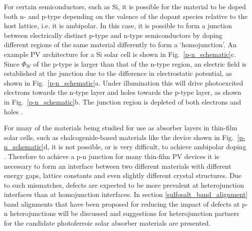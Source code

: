 \documentclass[11pt, twoside]{report}
\begin{document}
For certain semiconductors, such as Si, it is possible for the material to be doped both n- and p-type depending on the valence of the dopant species relative to the host lattice, i.e. it is ambipolar. In this case, it is possible to form a junction between electrically distinct p-type and n-type semiconductors by doping different regions of the same material differently to form a `homojunction'. An example PV architecture for a Si solar cell is shown in Fig.~\ref{p-n_schematic}c. Since $\Phi_W$ of the p-type is larger than that of the n-type region, an electric field is established at the junction due to the difference in electrostatic potential, as shown in Fig.~\ref{p-n_schematic}a. Under illumination this will drive photoexcited electrons towards the n-type layer and holes towards the p-type layer, as shown in Fig.~\ref{p-n_schematic}b. The junction region is depleted of both electrons and holes \cite{Nelson5}.

For many of the materials being studied for use as absorber layers in thin-film solar cells, such as chalcogenide-based materials like the device shown in Fig.~\ref{p-n_schematic}d, it is not possible, or is very difficult, to achieve ambipolar doping \cite{band_alignment_review, Zhang_doping_limits}. Therefore to achieve a p-n junction for many thin-film PV devices it is necessary to form an interface between two different materials with different energy gaps, lattice constants and even slightly different crystal structures. Due to such mismatches, defects are expected to be more prevalent at heterojunction interfaces than at homojunction interfaces. In section \ref{sulfosalt_band_alignment} band alignments that have been proposed for reducing the impact of defects at p-n heterojunctions will be discussed and suggestions for heterojunction partners for the candidate photoferroic solar absorber materials are presented.
\end{document}
